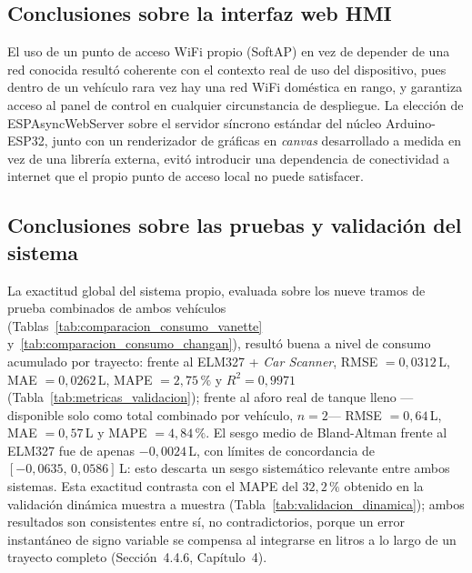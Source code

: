 \subsection{Conclusiones sobre la interfaz web HMI}

El uso de un punto de acceso WiFi propio (SoftAP) en vez de depender de una red conocida resultó coherente con el contexto real de uso del dispositivo, pues dentro de un vehículo rara vez hay una red WiFi doméstica en rango, y garantiza acceso al panel de control en cualquier circunstancia de despliegue. La elección de ESPAsyncWebServer sobre el servidor síncrono estándar del núcleo Arduino-ESP32, junto con un renderizador de gráficas en \textit{canvas} desarrollado a medida en vez de una librería externa, evitó introducir una dependencia de conectividad a internet que el propio punto de acceso local no puede satisfacer.

\subsection{Conclusiones sobre las pruebas y validación del sistema}
\label{sec:conclusiones_validacion}

La exactitud global del sistema propio, evaluada sobre los nueve tramos de prueba combinados de ambos vehículos (Tablas~\ref{tab:comparacion_consumo_vanette} y~\ref{tab:comparacion_consumo_changan}), resultó buena a nivel de consumo acumulado por trayecto: frente al ELM327 + \textit{Car Scanner}, RMSE $=0{,}0312$\,L, MAE $=0{,}0262$\,L, MAPE $=2{,}75\,\%$ y $R^2=0{,}9971$ (Tabla~\ref{tab:metricas_validacion}); frente al aforo real de tanque lleno —disponible solo como total combinado por vehículo, $n=2$— RMSE $=0{,}64$\,L, MAE $=0{,}57$\,L y MAPE $=4{,}84\,\%$. El sesgo medio de Bland-Altman frente al ELM327 fue de apenas $-0{,}0024$\,L, con límites de concordancia de $[-0{,}0635,\,0{,}0586]$\,L: esto descarta un sesgo sistemático relevante entre ambos sistemas. Esta exactitud contrasta con el MAPE del $32{,}2\,\%$ obtenido en la validación dinámica muestra a muestra (Tabla~\ref{tab:validacion_dinamica}); ambos resultados son consistentes entre sí, no contradictorios, porque un error instantáneo de signo variable se compensa al integrarse en litros a lo largo de un trayecto completo (Sección~4.4.6, Capítulo~4).

